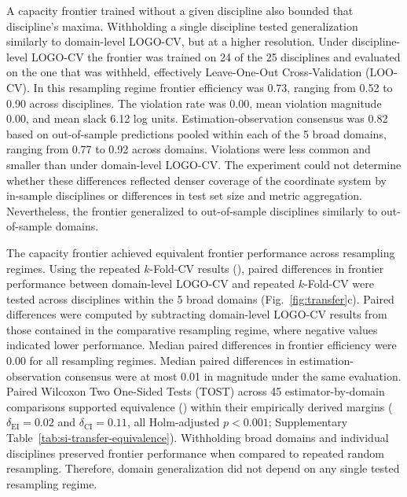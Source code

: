 \documentclass{article}
\begin{document}
A capacity frontier trained without a given discipline also bounded that discipline’s maxima. Withholding a single discipline tested generalization similarly to domain-level LOGO-CV, but at a higher resolution. Under discipline-level LOGO-CV the frontier was trained on 24 of the 25 disciplines and evaluated on the one that was withheld, effectively Leave-One-Out Cross-Validation (LOO-CV). In this resampling regime frontier efficiency was 0.73, ranging from 0.52 to 0.90 across disciplines. The violation rate was 0.00, mean violation magnitude 0.00, and mean slack 6.12 log units. Estimation-observation consensus was 0.82 based on out-of-sample predictions pooled within each of the 5 broad domains, ranging from 0.77 to 0.92 across domains. Violations were less common and smaller than under domain-level LOGO-CV. The experiment could not determine whether these differences reflected denser coverage of the coordinate system by in-sample disciplines or differences in test set size and metric aggregation. Nevertheless, the frontier generalized to out-of-sample disciplines similarly to out-of-sample domains.

The capacity frontier achieved equivalent frontier performance across resampling regimes. Using the repeated $k$-Fold-CV results (), paired differences in frontier performance between domain-level LOGO-CV and repeated $k$-Fold-CV were tested across disciplines within the 5 broad domains (Fig.~\ref{fig:transfer}c). Paired differences were computed by subtracting domain-level LOGO-CV results from those contained in the comparative resampling regime, where negative values indicated lower performance. Median paired differences in frontier efficiency were 0.00 for all resampling regimes. Median paired differences in estimation-observation consensus were at most 0.01 in magnitude under the same evaluation. Paired Wilcoxon Two One-Sided Tests (TOST) across 45 estimator-by-domain comparisons supported equivalence () within their empirically derived margins ($\delta_{\mathrm{EI}} = 0.02$ and $\delta_{\mathrm{CI}} = 0.11$, all Holm-adjusted $p < 0.001$; Supplementary Table~\ref{tab:si-transfer-equivalence}). Withholding broad domains and individual disciplines preserved frontier performance when compared to repeated random resampling. Therefore, domain generalization did not depend on any single tested resampling regime.
\end{document}
